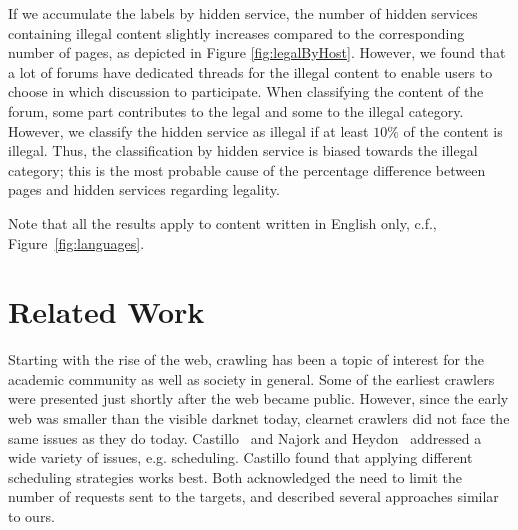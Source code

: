 \documentclass[USenglish,oneside,twocolumn]{article}
\begin{document}
If we accumulate the labels by hidden service, the number of hidden services containing illegal content slightly increases compared to the corresponding number of pages, as depicted in Figure \ref{fig:legalByHost}.
However, we found that a lot of forums have dedicated threads for the illegal content to enable users to choose in which discussion to participate. When classifying the content of the forum, some part contributes to the legal and some to the illegal category. However, we classify the hidden service as illegal if at least $10\%$ of the content is illegal. Thus, the classification by hidden service is biased towards the illegal category; this is the most probable cause of the percentage difference between pages and hidden services regarding legality.


Note that all the results apply to content written in English only, c.f., Figure~\ref{fig:languages}.


\section{Related Work}\label{sec:relatedwork}

Starting with the rise of the web, crawling has been a topic of interest  for the academic community as well as society in general. Some of the earliest crawlers \cite{Gray1993,McBryan1994, Eichmann1994, Pinkerton1994} were presented just shortly after the web became public. However, since the early web was smaller than the visible darknet today, clearnet crawlers did not face the same issues as they do today. Castillo~\cite{Castillo2005} and Najork and Heydon~\cite{Najork2002} addressed a wide variety of issues, e.g. scheduling. Castillo found that applying different scheduling strategies works best. Both acknowledged the need to limit the number of requests sent to the targets, and described several approaches similar to ours.
\end{document}
